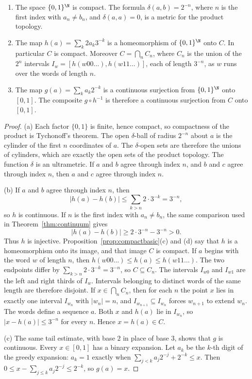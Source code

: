 \begin{proposition}\label{prop:cantor}
\begin{enumerate}[label=(\alph*)]
\item The space $\{0,1\}^\N$ is compact. The formula $\delta(a,b)=2^{-n}$, where $n$ is the first index with $a_n\ne b_n$, and $\delta(a,a)=0$, is a metric for the product topology.
\item The map $h(a)=\sum_k 2a_k 3^{-k}$ is a homeomorphism of $\{0,1\}^\N$ onto $C$. In particular $C$ is compact. Moreover $C=\bigcap_n C_n$, where $C_n$ is the union of the $2^n$ intervals $I_w=[h(w00\ldots),h(w11\ldots)]$, each of length $3^{-n}$, as $w$ runs over the words of length $n$.
\item The map $g(a)=\sum_k a_k 2^{-k}$ is a continuous surjection from $\{0,1\}^\N$ onto $[0,1]$. The composite $g\circ h^{-1}$ is therefore a continuous surjection from $C$ onto $[0,1]$.
\end{enumerate}
\end{proposition}
\begin{proof}
(a) Each factor $\{0,1\}$ is finite, hence compact, so compactness of the product is Tychonoff's theorem. The open $\delta$-ball of radius $2^{-n}$ about $a$ is the cylinder of the first $n$ coordinates of $a$. The $\delta$-open sets are therefore the unions of cylinders, which are exactly the open sets of the product topology. The function $\delta$ is an ultrametric. If $a$ and $b$ agree through index $n$, and $b$ and $c$ agree through index $n$, then $a$ and $c$ agree through index $n$.

(b) If $a$ and $b$ agree through index $n$, then
\[|h(a)-h(b)|\le\sum_{k>n}2\cdot 3^{-k}=3^{-n},\]
so $h$ is continuous. If $n$ is the first index with $a_n\ne b_n$, the same comparison used in Theorem~\ref{thm:continuum} gives
\[|h(a)-h(b)|\ge 2\cdot 3^{-n}-3^{-n}>0.\]
Thus $h$ is injective. Proposition~\ref{prop:compactbasic}(c) and (d) say that $h$ is a homeomorphism onto its image, and that image $C$ is compact. If $a$ begins with the word $w$ of length $n$, then $h(w00\ldots)\le h(a)\le h(w11\ldots)$. The two endpoints differ by $\sum_{k>n}2\cdot 3^{-k}=3^{-n}$, so $C\subseteq C_n$. The intervals $I_{w0}$ and $I_{w1}$ are the left and right thirds of $I_w$. Intervals belonging to distinct words of the same length are therefore disjoint. If $x\in\bigcap_n C_n$, then for each $n$ the point $x$ lies in exactly one interval $I_{w_n}$ with $|w_n|=n$, and $I_{w_{n+1}}\subseteq I_{w_n}$ forces $w_{n+1}$ to extend $w_n$. The words define a sequence $a$. Both $x$ and $h(a)$ lie in $I_{w_n}$, so $|x-h(a)|\le 3^{-n}$ for every $n$. Hence $x=h(a)\in C$.

(c) The same tail estimate, with base $2$ in place of base $3$, shows that $g$ is continuous. Every $x\in[0,1]$ has a binary expansion. Let $a_k$ be the $k$-th digit of the greedy expansion: $a_k=1$ exactly when $\sum_{j<k}a_j 2^{-j}+2^{-k}\le x$. Then $0\le x-\sum_{j\le k}a_j 2^{-j}\le 2^{-k}$, so $g(a)=x$.
\end{proof}

